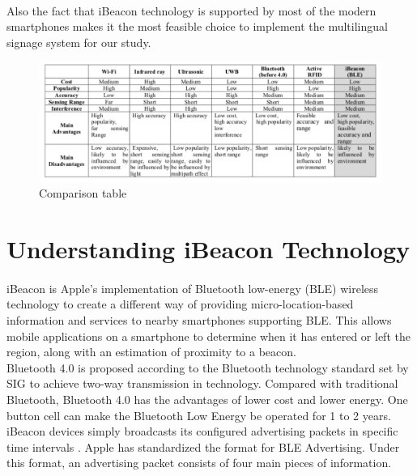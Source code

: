 \documentclass[12pt]{article}
\begin{document}
\paragraph{} Also the fact that iBeacon technology is supported by most of the modern smartphones \cite{indoor} makes it the most feasible choice to implement the multilingual signage system for our study.
 
\begin{center}
\begin{figure}[H]
	\centering
	\includegraphics[width=1.0\linewidth]{media/comparison.png}
	\caption{Comparison table}
	\label{fig:translate_uml}
\end{figure} 
\end{center}

\section{Understanding iBeacon Technology}
\label{iBeacon-tech}
\paragraph{}iBeacon is Apple’s implementation of Bluetooth low-energy (BLE) wireless technology to create a different way of providing micro-location-based information and services to nearby smartphones supporting BLE. This allows mobile applications on a smartphone to determine when it has entered or left the region, along with an estimation of proximity to a beacon. \\

Bluetooth 4.0 is proposed according to the Bluetooth technology standard set by SIG to achieve two-way transmission in technology. Compared with traditional Bluetooth, Bluetooth 4.0 has the advantages of lower cost and lower energy. One button cell can make the Bluetooth Low Energy be operated for 1 to 2 years. \cite{taiwan} \\

iBeacon devices simply broadcasts its configured advertising packets in specific time intervals \cite{one}. Apple has standardized the format for BLE Advertising. Under this format, an advertising packet consists of four main pieces of information. \\
\end{document}

